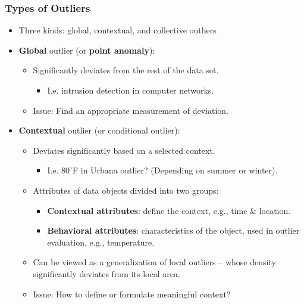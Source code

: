 \begin{frame}
	\frametitle{Types of Outliers}
	\begin{itemize}
		\item Three kinds: global, contextual, and collective outliers
		\item \textbf{Global} outlier (or \textbf{\color{airforceblue}point anomaly}):
		      \begin{itemize}
			      \item Significantly deviates from the rest of the data set.
			            \begin{itemize}
				            \item I.e. intrusion detection in computer networks.
			            \end{itemize}
			      \item Issue: Find an appropriate measurement of deviation.
		      \end{itemize}
		\item \textbf{Contextual} outlier (or conditional outlier):
		      \begin{itemize}
			      \item Deviates significantly based on a selected context.
			            \begin{itemize}
				            \item I.e.  $80^{\circ}$F in Urbana outlier? (Depending on summer or winter).
			            \end{itemize}
			      \item Attributes of data objects divided into two groups:
			            \begin{itemize}
				            \item \textbf{Contextual attributes}: define the context, e.g., time \& location.
				            \item \textbf{Behavioral attributes}: characteristics of the object, used in outlier evaluation, e.g., temperature.
			            \end{itemize}
			      \item Can be viewed as a generalization of local outliers -- whose density significantly deviates from its local area.
			      \item Issue: How to define or formulate meaningful context?
		      \end{itemize}
	\end{itemize}


\end{frame}
